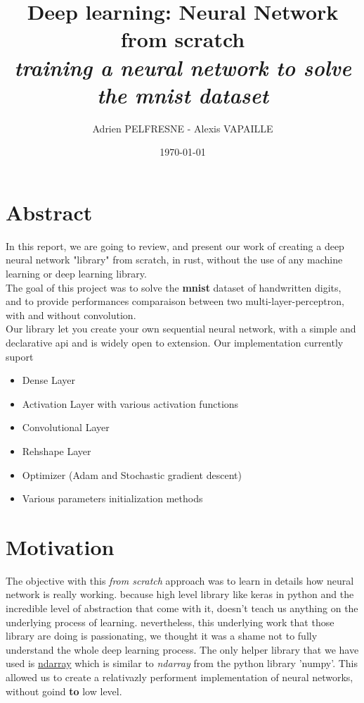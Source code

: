 \documentclass[a4paper, twocolumn, twoside]{article}
\title{Deep learning: Neural Network from scratch\\
\textit{training a neural network to solve the mnist dataset}}
\author{Adrien PELFRESNE - Alexis VAPAILLE}
\date{\today}
\begin{document}
	\onecolumn
    \maketitle
	\tableofcontents

	\section{Abstract}
	In this report, we are going to review, and present our work
	of creating a deep neural network "library" from scratch, in rust, without the use of any machine learning or deep learning library.\\
	The goal of this project was to solve the \textbf{mnist} dataset of handwritten digits, and to provide performances comparaison between
	two multi-layer-perceptron, with and without convolution.\\
	Our library let you create your own sequential neural network, with a simple and declarative api and is widely open to extension.
	Our implementation currently suport
	\begin{itemize}
		\item{Dense Layer}
		\item{Activation Layer with various activation functions}
		\item{Convolutional Layer}
		\item{Rehshape Layer}
		\item{Optimizer (Adam and Stochastic gradient descent)}
		\item{Various parameters initialization methods}
	\end{itemize}
	\clearpage
	
	\twocolumn
	\section{Motivation}
	The objective with this \textit{from scratch} approach was to learn in details how neural network is really working. because high level library like keras in python
	and the incredible level of abstraction that come with it, doesn't teach us anything on the underlying process of learning. nevertheless,
	this underlying work that those library are doing is passionating,
	we thought it was a shame not to fully understand the whole deep learning process.
	The only helper library that we have used is \href{https://crates.io/crates/ndarray}{ndarray} which is similar to \textit{ndarray} from the python library 'numpy'.
	This allowed us to create a relativazly performent implementation of neural networks, without goind \textbf{to} low level.
\end{document}
